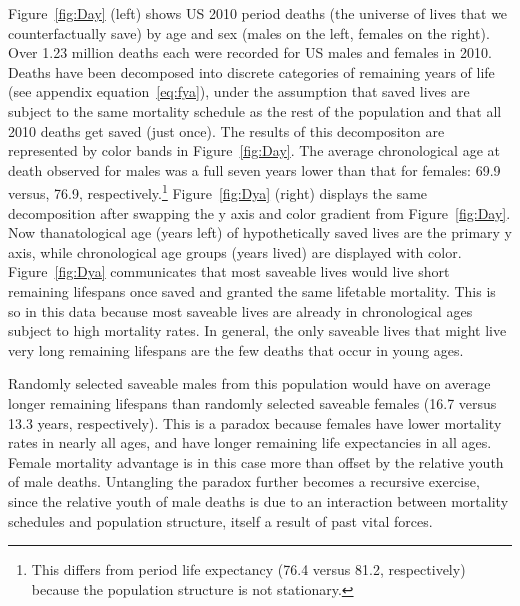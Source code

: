 \documentclass{article}
\begin{document}
Figure~\ref{fig:Day} (left) shows US 2010 period
deaths (the universe of lives that we counterfactually save) by age and sex (males on the left, females on the
right).
Over 1.23 million deaths each were recorded for US males and females in 2010. Deaths have been decomposed into discrete
categories of remaining years of life (see appendix
equation~\eqref{eq:fya}), under the assumption that saved lives are subject to
the same mortality schedule as the rest of the population and that all 2010
deaths get saved (just once). The results of this decompositon are represented
by color bands in Figure~\ref{fig:Day}. The average chronological age at death
observed for males was a full seven years lower than that for females: 69.9
versus, 76.9, respectively.\footnote{This differs from period life expectancy
(76.4 versus 81.2, respectively) because the population structure is not
stationary.}
Figure~\ref{fig:Dya} (right) displays the same decomposition after swapping the y axis and color gradient from Figure~\ref{fig:Day}. Now thanatological age (years left) of hypothetically saved lives are the primary y axis, while chronological age groups (years lived) are displayed with color. Figure~\ref{fig:Dya} communicates that most saveable lives would live short remaining lifespans once saved and granted the same lifetable mortality. This is so in this data because most saveable lives are already in chronological ages subject to high mortality rates. In general, the only saveable lives that might live very long remaining lifespans are the few deaths that occur in young ages. 

Randomly
selected saveable males from this population would have on average longer
remaining lifespans than randomly selected saveable females (16.7 versus 13.3 years,
respectively). This is a paradox because females have lower mortality rates in
nearly all ages, and have longer remaining life expectancies in all ages. Female
mortality advantage is in this case more than offset by the relative youth of
male deaths. Untangling the paradox further becomes a recursive exercise,
since the relative youth of male deaths is due to an interaction between
mortality schedules and population structure, itself a result of past
vital forces.
\end{document}
